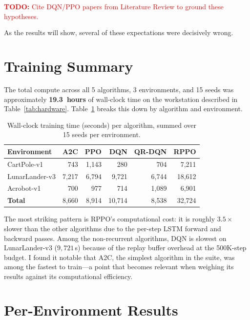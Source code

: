 \textcolor{red}{\textbf{TODO:} Cite DQN/PPO papers from Literature Review to ground these hypotheses.}

As the results will show, several of these expectations were decisively
wrong.

\section{Training Summary}
\label{sec:training-summary}

The total compute across all 5 algorithms, 3 environments, and 15 seeds
was approximately \textbf{19.3~hours} of wall-clock time on the
workstation described in Table~\ref{tab:hardware}. Table~\ref{tab:training-time}
breaks this down by algorithm and environment.

\begin{table}[htbp!]
\centering
\caption{Wall-clock training time (seconds) per algorithm, summed over
         15 seeds per environment.}
\label{tab:training-time}
\begin{tabular}{lrrrrr}
\toprule
\textbf{Environment} & \textbf{A2C} & \textbf{PPO} & \textbf{DQN}
                      & \textbf{QR-DQN} & \textbf{RPPO} \\
\midrule
CartPole-v1     &    743 &  1{,}143 &    280 &    704 &  7{,}211 \\
LunarLander-v3  &  7{,}217 &  6{,}794 &  9{,}721 &  6{,}744 & 18{,}612 \\
Acrobot-v1      &    700 &    977 &    714 &  1{,}089 &  6{,}901 \\
\midrule
\textbf{Total}  &  8{,}660 &  8{,}914 & 10{,}714 &  8{,}538 & 32{,}724 \\
\bottomrule
\end{tabular}
\end{table}

The most striking pattern is RPPO's computational cost: it is roughly
$3.5\times$ slower than the other algorithms due to the per-step LSTM
forward and backward passes. Among the non-recurrent algorithms, DQN is
slowest on LunarLander-v3 ($9{,}721$\,s) because of the replay buffer
overhead at the 500K-step budget. I found it notable that A2C, the
simplest algorithm in the suite, was among the fastest to train---a
point that becomes relevant when weighing its results against its
computational efficiency.

\section{Per-Environment Results}
\label{sec:per-env-results}

